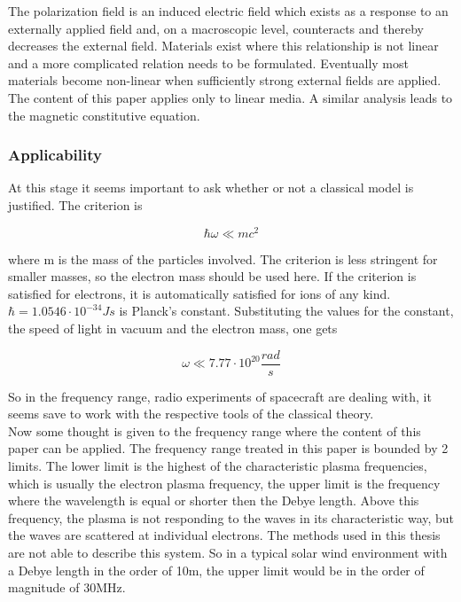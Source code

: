 \documentclass[a4paper,11pt]{article}
\begin{document}
The polarization field is an induced electric field which exists as a response to an externally applied field and, on a macroscopic level, counteracts and thereby decreases the external field. Materials exist where this relationship is not linear and a more complicated relation needs to be formulated. Eventually most materials become non-linear when
sufficiently strong external fields are applied. The content of this paper applies only to linear media. A similar analysis leads to the magnetic constitutive equation.\\



\subsubsection{Applicability}
At this stage it seems important to ask whether or not a classical model is justified. The criterion is

\begin{equation}
    \hbar \omega \ll m c^2
\end{equation}

where m is the mass of the particles involved. The criterion is less stringent for smaller masses, so the electron mass should be used here. If the criterion is satisfied for electrons, it is automatically satisfied for ions of any kind. $\hbar=1.0546 \cdot 10^{-34} Js $ is Planck's constant. Substituting the values for the constant, the speed of light in vacuum and the electron mass, one gets

\begin{equation}
    \omega \ll 7.77 \cdot 10^{20} \frac{rad}{s}
\end{equation}

So in the frequency range, radio experiments of spacecraft are dealing with, it seems save to work with the respective tools of the classical theory.\\

Now some thought is given to the frequency range where the content of this paper can be applied. The frequency range treated in this paper is bounded by 2 limits. The lower limit is the highest of the characteristic plasma frequencies,
which is usually the electron plasma frequency, the upper limit is the frequency where the wavelength is equal or shorter then the Debye
length. Above this frequency, the plasma is not responding to the waves in its characteristic way, but the waves are scattered at individual electrons. The methods used in this thesis are not able to describe this system. So in a typical solar wind environment with a Debye length in the order of 10m, the upper limit would be in the order of magnitude of 30MHz.
\end{document}
